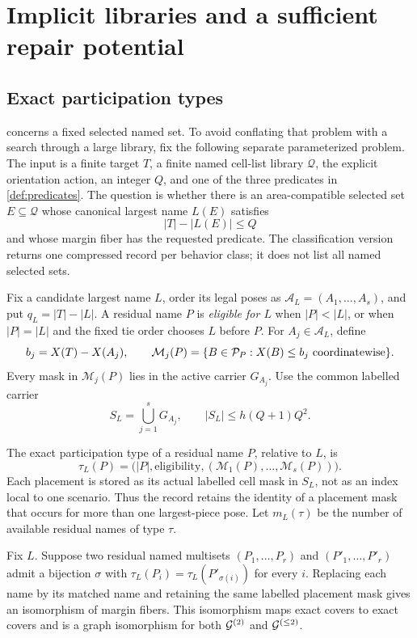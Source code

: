 \section{Implicit libraries and a sufficient repair potential}
\label{sec:types-energy}

\subsection{Exact participation types}

 concerns a fixed selected named set.  To avoid conflating that
problem with a search through a large library, fix the following separate
parameterized problem.  The input is a finite target \(T\), a finite named
cell-list library \(\mathcal Q\), the explicit orientation action, an integer
\(Q\), and one of the three predicates in \cref{def:predicates}.  The question
is whether there is an area-compatible selected set \(E\subseteq\mathcal Q\)
whose canonical largest name \(L(E)\) satisfies
\[
 |T|-|L(E)|\leq Q
\]
and whose margin fiber has the requested predicate.  The classification
version returns one compressed record per behavior class; it does not list
all named selected sets.

Fix a candidate largest name \(L\), order its legal poses as
\(\mathcal A_L=(A_1,\ldots,A_s)\), and put \(q_L=|T|-|L|\).  A residual name
\(P\) is \emph{eligible for \(L\)} when \(|P|<|L|\), or when
\(|P|=|L|\) and the fixed tie order chooses \(L\) before \(P\).  For
\(A_j\in\mathcal A_L\), define
\[
 b_j=X(T)-X(A_j),\qquad
 \mathcal M_j(P)=\{B\in\mathcal P_P:X(B)\leq b_j\text{ coordinatewise}\}.
\]
Every mask in \(\mathcal M_j(P)\) lies in the active carrier \(G_{A_j}\).
Use the common labelled carrier
\[
 S_L=\bigcup_{j=1}^{s}G_{A_j},
 \qquad |S_L|\leq h(Q+1)Q^2.
\]

\begin{definition}\label{def:participation-type}
The exact participation type of a residual name \(P\), relative to \(L\), is
\[
 \tau_L(P)=
 \bigl(|P|,\text{eligibility},
       (\mathcal M_1(P),\ldots,\mathcal M_s(P))\bigr).
\]
Each placement is stored as its actual labelled cell mask in \(S_L\), not as
an index local to one scenario.  Thus the record retains the identity of a
placement mask that occurs for more than one largest-piece pose.  Let
\(m_L(\tau)\) be the number of available residual names of type \(\tau\).
\end{definition}

\begin{lemma}\label{lem:type-isomorphism}
Fix \(L\).  Suppose two residual named multisets
\((P_1,\ldots,P_r)\) and \((P'_1,\ldots,P'_r)\) admit a bijection \(\sigma\)
with \(\tau_L(P_i)=\tau_L(P'_{\sigma(i)})\) for every \(i\).  Replacing each
name by its matched name and retaining the same labelled placement mask gives
an isomorphism of margin fibers.  This isomorphism maps exact covers to exact
covers and is a graph isomorphism for both \(\mathcal G^{(2)}\) and
\(\mathcal G^{(\leq2)}\).
\end{lemma}

